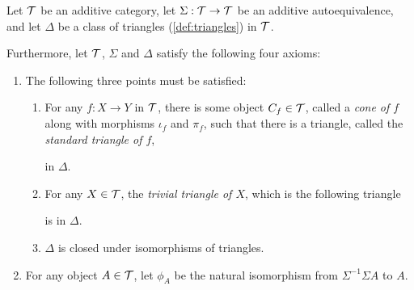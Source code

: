 \begin{definition}
    \label{def:triangulated_category}
    Let \( {\mathcal{T}} \) be an additive category, let \( \Sigma: {\mathcal{T}} \to {\mathcal{T}} \) be an additive autoequivalence, and let \( \Delta \) be a class of triangles (\autoref{def:triangles}) in \( {\mathcal{T}} \).

    Furthermore, let \( {\mathcal{T}} \), \( \Sigma \) and \( \Delta \) satisfy the following four axioms:
    \begin{enumerate}[label={(\bfseries TR\arabic*)}]
        \item {
            The following three points must be satisfied:
            \begin{enumerate}
                \item {
                    For any \( f: X \to Y \) in \( {\mathcal{T}} \), there is some object \( C_f \in {\mathcal{T}} \), called a \emph{cone of \( f \)} along with morphisms \( \iota_f \) and \( \pi_f \), such that there is a triangle, called the \emph{standard triangle of \( f \)},
                    \begin{center}
                    \end{center}
                    in \( \Delta \).
                }
                \item {
                    For any \( X \in {\mathcal{T}} \), the \emph{trivial triangle of \( X \)}, which is the following triangle
                    \begin{center}
                    \end{center}
                    is in \( \Delta \).
                }
                \item {
                    \( \Delta \) is closed under isomorphisms of triangles.
                }
            \end{enumerate}
        }
        \item {
            For any object \( A \in {\mathcal{T}} \), let \( \phi_A \) be the natural isomorphism from \( \Sigma^{-1} \Sigma A \) to \( A \).

}
\end{enumerate}
\end{definition}
